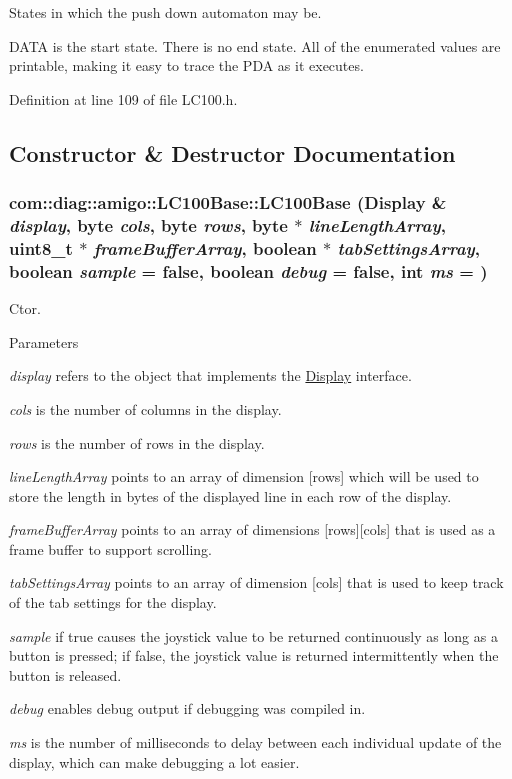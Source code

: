 States in which the push down automaton may be. 

DATA is the start state. There is no end state. All of the enumerated values are printable, making it easy to trace the PDA as it executes. 

Definition at line 109 of file LC100.h.



\subsection{Constructor \& Destructor Documentation}
\hypertarget{classcom_1_1diag_1_1amigo_1_1LC100Base_a0ae2e5e38c16b74237104acc7a75003c}{
\subsubsection[{LC100Base}]{\setlength{\rightskip}{0pt plus 5cm}com::diag::amigo::LC100Base::LC100Base ({\bf Display} \& {\em display}, \/  byte {\em cols}, \/  byte {\em rows}, \/  byte $\ast$ {\em lineLengthArray}, \/  uint8\_\-t $\ast$ {\em frameBufferArray}, \/  boolean $\ast$ {\em tabSettingsArray}, \/  boolean {\em sample} = {\ttfamily false}, \/  boolean {\em debug} = {\ttfamily false}, \/  int {\em ms} = {})}}
\label{classcom_1_1diag_1_1amigo_1_1LC100Base_a0ae2e5e38c16b74237104acc7a75003c}


Ctor. 


\begin{DoxyParams}{Parameters}
\item[{\em display}]refers to the object that implements the \hyperlink{structcom_1_1diag_1_1amigo_1_1Display}{Display} interface. \item[{\em cols}]is the number of columns in the display. \item[{\em rows}]is the number of rows in the display. \item[{\em lineLengthArray}]points to an array of dimension \mbox{[}rows\mbox{]} which will be used to store the length in bytes of the displayed line in each row of the display. \item[{\em frameBufferArray}]points to an array of dimensions \mbox{[}rows\mbox{]}\mbox{[}cols\mbox{]} that is used as a frame buffer to support scrolling. \item[{\em tabSettingsArray}]points to an array of dimension \mbox{[}cols\mbox{]} that is used to keep track of the tab settings for the display. \item[{\em sample}]if true causes the joystick value to be returned continuously as long as a button is pressed; if false, the joystick value is returned intermittently when the button is released. \item[{\em debug}]enables debug output if debugging was compiled in. \item[{\em ms}]is the number of milliseconds to delay between each individual update of the display, which can make debugging a lot easier. \end{DoxyParams}


